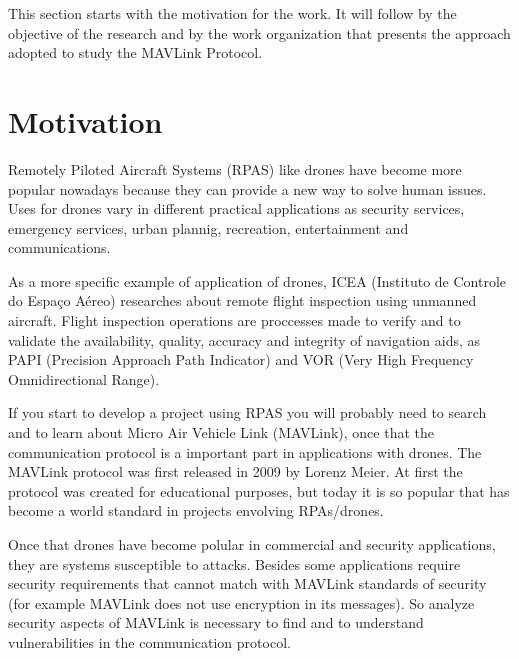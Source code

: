 This section starts with the motivation for the work. It will follow by the objective of the research and by the work organization that presents the approach adopted to study the MAVLink Protocol.

\section{Motivation}
Remotely Piloted Aircraft Systems (RPAS) like drones have become more popular nowadays because they can provide a new way to solve human issues. Uses for drones vary in different practical applications as security services, emergency services, urban plannig, recreation, entertainment and communications.

As a more specific example of application of drones, ICEA (Instituto de Controle do Espaço Aéreo) researches about remote flight inspection using unmanned aircraft. Flight inspection operations are proccesses made to verify and to validate the availability, quality, accuracy and integrity of navigation aids, as PAPI (Precision Approach Path Indicator) and VOR (Very High Frequency Omnidirectional Range).

If you start to develop a project using RPAS you will probably need to search and to learn about Micro Air Vehicle Link (MAVLink), once that the communication protocol is a important part in applications with drones.
The MAVLink protocol was first released in 2009 by Lorenz Meier. At first the protocol was created for educational purposes, but today it is so popular that has become a world standard in projects envolving RPAs/drones.

Once that drones have become polular in commercial and security applications, they are systems susceptible to attacks. Besides some applications require security requirements that cannot match with MAVLink standards of security (for example MAVLink does not use encryption in its messages). So analyze security aspects of MAVLink is necessary to find and to understand vulnerabilities in the communication protocol.



